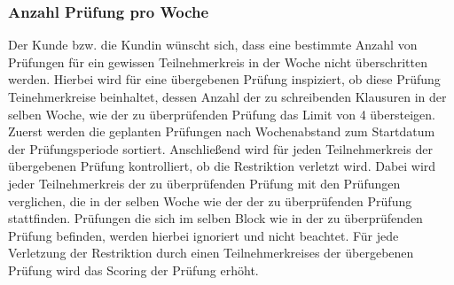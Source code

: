 \subsubsection{Anzahl Prüfung pro Woche}
Der Kunde bzw. die Kundin wünscht sich,
dass eine bestimmte Anzahl von Prüfungen für ein gewissen Teilnehmerkreis
in der Woche nicht überschritten werden.
Hierbei wird für eine übergebenen Prüfung inspiziert,
ob diese Prüfung Teinehmerkreise beinhaltet, dessen Anzahl der zu schreibenden Klausuren in der selben Woche,
wie der zu überprüfenden Prüfung das Limit von 4 übersteigen.
Zuerst werden die geplanten Prüfungen nach Wochenabstand zum Startdatum der Prüfungsperiode sortiert.
Anschließend wird für jeden Teilnehmerkreis der übergebenen Prüfung kontrolliert,
ob die Restriktion verletzt wird.
Dabei wird jeder Teilnehmerkreis der zu überprüfenden Prüfung mit
den Prüfungen verglichen, die in der selben Woche wie der der zu überprüfenden Prüfung stattfinden.
Prüfungen die sich im selben Block wie in der zu überprüfenden Prüfung befinden,
werden hierbei ignoriert und nicht beachtet.
Für jede Verletzung der Restriktion durch einen Teilnehmerkreises der übergebenen Prüfung wird das Scoring der Prüfung erhöht.



